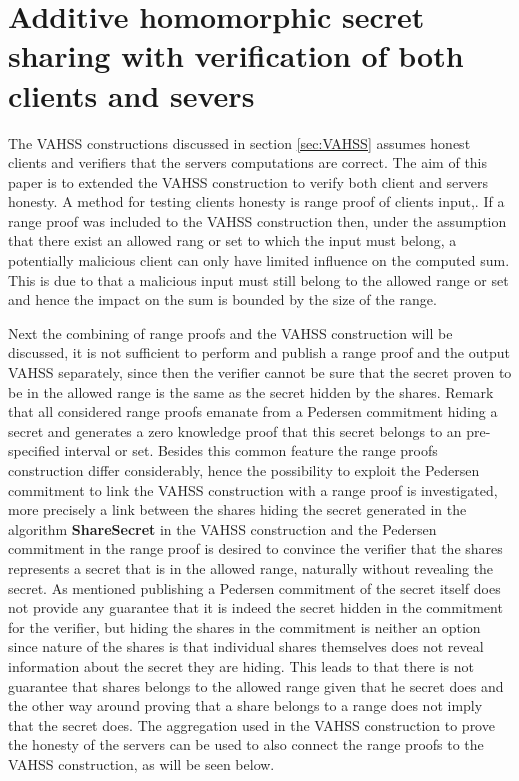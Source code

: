 	

\section{Additive homomorphic secret sharing with verification of both clients and severs }
\label{sec:combination}

The  VAHSS constructions  discussed in section \ref{sec:VAHSS} assumes honest clients and verifiers that the servers computations are correct. The aim of this paper is to extended the VAHSS construction to verify both client and servers honesty.  A method for testing clients honesty is range proof of clients input,. If a range proof was included to the VAHSS construction then, under the assumption that there exist an allowed rang or set to which the input must belong, a potentially malicious client can only have limited influence on the computed sum. This is due to that a malicious input must still belong to the allowed range or set and hence the impact on the sum is bounded by the size of the range. 

Next the combining of range proofs and the VAHSS construction will be discussed, it is not sufficient to perform and publish a range proof and the output VAHSS separately, since then the verifier cannot be sure that the secret proven to be in the allowed range is the same as the secret hidden by the shares. Remark that all considered range proofs emanate from a Pedersen commitment hiding a secret and generates a zero knowledge proof that this secret belongs to an pre-specified interval or set. Besides this common feature the range proofs construction differ considerably, hence the possibility to exploit the Pedersen commitment to link the VAHSS construction with a range proof is investigated, more precisely a link between the shares hiding the secret generated in the algorithm \textbf{ShareSecret} in the VAHSS construction and the Pedersen commitment in the range proof is desired to  convince the verifier that the shares represents a secret that is in the allowed range, naturally without revealing the secret. As mentioned publishing a Pedersen commitment of the secret itself does not provide any guarantee that it is indeed the secret hidden in the commitment for the verifier, but hiding the shares in the commitment is neither an option since nature of the shares is that individual shares themselves does not reveal information about the secret they are hiding. This leads to that there is not guarantee that shares belongs to the allowed range given that he secret does and the other way around proving that a share belongs to a range does not imply that the secret does. The aggregation used in the VAHSS construction to prove the honesty of the servers can be used to also connect the range proofs to the VAHSS construction, as will be seen below. 

